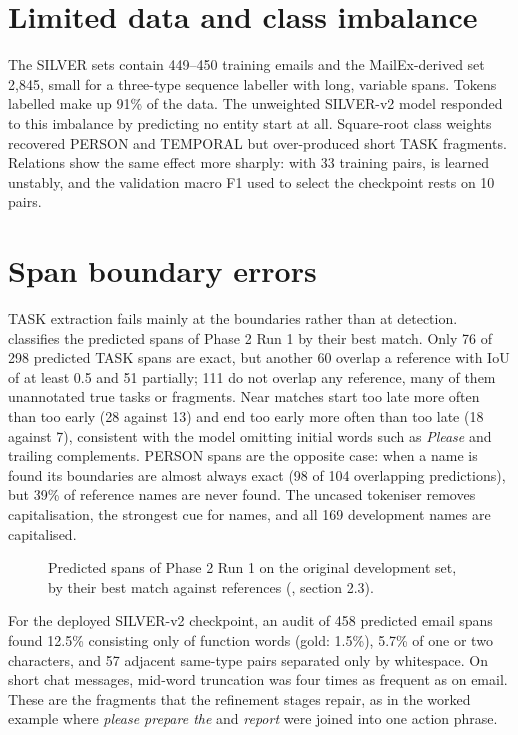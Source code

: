 \section{Limited data and class imbalance}
The SILVER sets contain 449--450 training emails and the MailEx-derived set 2,845, small for a three-type sequence labeller with long, variable spans. Tokens labelled  make up 91\% of the data. The unweighted SILVER-v2 model responded to this imbalance by predicting no entity start at all. Square-root class weights recovered PERSON and TEMPORAL but over-produced short TASK fragments. Relations show the same effect more sharply: with 33 training pairs,  is learned unstably, and the validation macro F1 used to select the checkpoint rests on 10 pairs.

\section{Span boundary errors}
TASK extraction fails mainly at the boundaries rather than at detection.  classifies the predicted spans of Phase 2 Run 1 by their best match. Only 76 of 298 predicted TASK spans are exact, but another 60 overlap a reference with IoU of at least 0.5 and 51 partially; 111 do not overlap any reference, many of them unannotated true tasks or fragments. Near matches start too late more often than too early (28 against 13) and end too early more often than too late (18 against 7), consistent with the model omitting initial words such as \emph{Please} and trailing complements. PERSON spans are the opposite case: when a name is found its boundaries are almost always exact (98 of 104 overlapping predictions), but 39\% of reference names are never found. The uncased tokeniser removes capitalisation, the strongest cue for names, and all 169 development names are capitalised.

\begin{figure}[t]
\centering
{}
\caption[Error anatomy of predicted spans]{Predicted spans of Phase 2 Run 1 on the original development set, by their best match against references (, section 2.3).}
\label{fig:erroranatomy}
\end{figure}

For the deployed SILVER-v2 checkpoint, an audit of 458 predicted email spans found 12.5\% consisting only of function words (gold: 1.5\%), 5.7\% of one or two characters, and 57 adjacent same-type pairs separated only by whitespace. On short chat messages, mid-word truncation was four times as frequent as on email. These are the fragments that the refinement stages repair, as in the worked example where \emph{please prepare the} and \emph{report} were joined into one action phrase.


